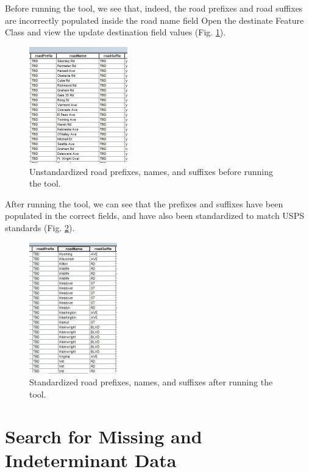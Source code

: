 \documentclass[openany]{book}
\theoremstyle{definition}
\theoremstyle{definition}
\theoremstyle{definition}
\theoremstyle{remark}
\begin{document}
Before running the tool, we see that, indeed, the road prefixes and road
suffixes are incorrectly populated inside the road name field Open the
destinate Feature Class and view the update destination field values
(Fig. \ref{fig:std3before}).

\begin{figure}[H]

{\centering \includegraphics[width=1.68in,]{figures/std3-before} 

}

\caption{Unstandardized road prefixes, names, and suffixes before running the tool.}\label{fig:std3before}
\end{figure}

After running the tool, we can see that the prefixes and suffixes have
been populated in the correct fields, and have also been standardized to
match USPS standards (Fig. \ref{fig:std3after}).

\begin{figure}[H]

{\centering \includegraphics[width=1.5in,]{figures/std3-after} 

}

\caption{Standardized road prefixes, names, and suffixes after running the tool.}\label{fig:std3after}
\end{figure}

\hypertarget{indtSearch}{\chapter{Search for Missing and Indeterminant
Data}\label{indtSearch}}
\end{document}
